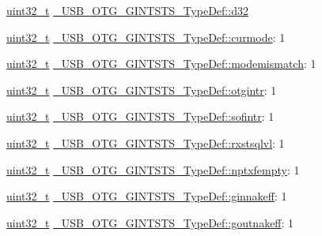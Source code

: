 \begin{DoxyCompactItemize}
\begin{tabbing}
\end{tabbing}\item 
\hyperlink{stdint_8h_a435d1572bf3f880d55459d9805097f62}{uint32\-\_\-t} \hyperlink{group___u_s_b___o_t_g___d_r_i_v_e_r_ga1855525a82d4050ac6b5175c46cb4764}{\-\_\-\-U\-S\-B\-\_\-\-O\-T\-G\-\_\-\-G\-I\-N\-T\-S\-T\-S\-\_\-\-Type\-Def\-::d32}
\item 
\hyperlink{stdint_8h_a435d1572bf3f880d55459d9805097f62}{uint32\-\_\-t} \hyperlink{group___u_s_b___o_t_g___d_r_i_v_e_r_ga752eb7894d8acb9f1a4394967bfdd9ff}{\-\_\-\-U\-S\-B\-\_\-\-O\-T\-G\-\_\-\-G\-I\-N\-T\-S\-T\-S\-\_\-\-Type\-Def\-::curmode}\-: 1
\item 
\hyperlink{stdint_8h_a435d1572bf3f880d55459d9805097f62}{uint32\-\_\-t} \hyperlink{group___u_s_b___o_t_g___d_r_i_v_e_r_gab4fbf47de9e36e092edfc6ee201616d2}{\-\_\-\-U\-S\-B\-\_\-\-O\-T\-G\-\_\-\-G\-I\-N\-T\-S\-T\-S\-\_\-\-Type\-Def\-::modemismatch}\-: 1
\item 
\hyperlink{stdint_8h_a435d1572bf3f880d55459d9805097f62}{uint32\-\_\-t} \hyperlink{group___u_s_b___o_t_g___d_r_i_v_e_r_ga8c6022a9b96f1a881f956e7bafe64497}{\-\_\-\-U\-S\-B\-\_\-\-O\-T\-G\-\_\-\-G\-I\-N\-T\-S\-T\-S\-\_\-\-Type\-Def\-::otgintr}\-: 1
\item 
\hyperlink{stdint_8h_a435d1572bf3f880d55459d9805097f62}{uint32\-\_\-t} \hyperlink{group___u_s_b___o_t_g___d_r_i_v_e_r_ga90db453bd6bcb2c78bab6c0688727181}{\-\_\-\-U\-S\-B\-\_\-\-O\-T\-G\-\_\-\-G\-I\-N\-T\-S\-T\-S\-\_\-\-Type\-Def\-::sofintr}\-: 1
\item 
\hyperlink{stdint_8h_a435d1572bf3f880d55459d9805097f62}{uint32\-\_\-t} \hyperlink{group___u_s_b___o_t_g___d_r_i_v_e_r_ga5804e5c8afb57b10e1fd90dd4ad3286f}{\-\_\-\-U\-S\-B\-\_\-\-O\-T\-G\-\_\-\-G\-I\-N\-T\-S\-T\-S\-\_\-\-Type\-Def\-::rxstsqlvl}\-: 1
\item 
\hyperlink{stdint_8h_a435d1572bf3f880d55459d9805097f62}{uint32\-\_\-t} \hyperlink{group___u_s_b___o_t_g___d_r_i_v_e_r_ga7f95aea2bd53e9566d83818c6062f1ca}{\-\_\-\-U\-S\-B\-\_\-\-O\-T\-G\-\_\-\-G\-I\-N\-T\-S\-T\-S\-\_\-\-Type\-Def\-::nptxfempty}\-: 1
\item 
\hyperlink{stdint_8h_a435d1572bf3f880d55459d9805097f62}{uint32\-\_\-t} \hyperlink{group___u_s_b___o_t_g___d_r_i_v_e_r_gaa5f3025af7ef429aaf5284bc974f47bb}{\-\_\-\-U\-S\-B\-\_\-\-O\-T\-G\-\_\-\-G\-I\-N\-T\-S\-T\-S\-\_\-\-Type\-Def\-::ginnakeff}\-: 1
\item 
\hyperlink{stdint_8h_a435d1572bf3f880d55459d9805097f62}{uint32\-\_\-t} \hyperlink{group___u_s_b___o_t_g___d_r_i_v_e_r_ga141b86207565280b9a5e54a41ced9ff8}{\-\_\-\-U\-S\-B\-\_\-\-O\-T\-G\-\_\-\-G\-I\-N\-T\-S\-T\-S\-\_\-\-Type\-Def\-::goutnakeff}\-: 1

\end{DoxyCompactItemize}
